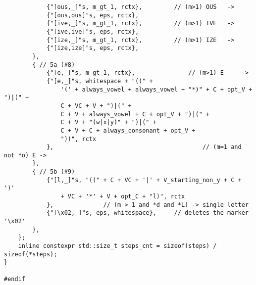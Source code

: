 \documentclass{article}
\begin{document}
\begin{appendices}
\begin{verbatim}
			{"[ous,_]"s, m_gt_1, rctx},			// (m>1) OUS   ->
			{"[ous,ous]"s, eps, rctx},
			{"[ive,_]"s, m_gt_1, rctx},			// (m>1) IVE   ->
			{"[ive,ive]"s, eps, rctx},
			{"[ize,_]"s, m_gt_1, rctx},			// (m>1) IZE   ->
			{"[ize,ize]"s, eps, rctx},
		},
		{ // 5a (#8)
			{"[e,_]"s, m_gt_1, rctx},				// (m>1) E     ->
			{"[e,_]"s, whitespace + "((" +
				'(' + always_vowel + always_vowel + "*)" + C + opt_V + ")|(" +
				C + VC + V + ")|(" +
				C + V + always_vowel + C + opt_V + ")|(" +
				C + V + "(w|x|y)" + ")|(" +
				C + V + C + always_consonant + opt_V +
				"))", rctx
			},											// (m=1 and not *o) E ->
		},
		{ // 5b (#9)
			{"[l,_]"s, "((" + C + VC + '|' + V_starting_non_y + C + ')'
				+ VC + '*' + V + opt_C + "l)", rctx
			},				// (m > 1 and *d and *L) -> single letter
			{"[\x02,_]"s, eps, whitespace}, 	// deletes the marker '\x02'
		},
	};
	inline constexpr std::size_t steps_cnt = sizeof(steps) / sizeof(*steps);
}

#endif
		\end{verbatim}
	\end{appendices}
\end{document}
